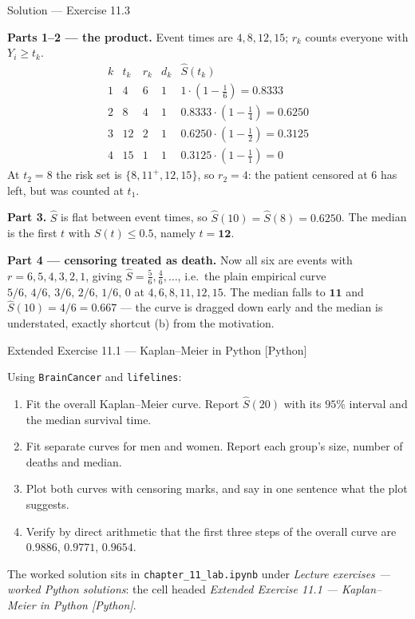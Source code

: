 \documentclass[aspectratio=169,11pt]{beamer}
\begin{document}
\begin{frame}{Solution --- Exercise 11.3}
  \footnotesize
\begin{solutionbox}
  \scriptsize
  \textbf{Parts 1--2 --- the product.} Event times are $4,8,12,15$; $r_k$ counts everyone
  with $Y_i\ge t_k$.
  \[
    \begin{array}{c|c|c|c|l}
      k & t_k & r_k & d_k & \hat S(t_k)\\ \hline
      1 & 4  & 6 & 1 & 1\cdot(1-\tfrac16)=0.8333\\
      2 & 8  & 4 & 1 & 0.8333\cdot(1-\tfrac14)=0.6250\\
      3 & 12 & 2 & 1 & 0.6250\cdot(1-\tfrac12)=0.3125\\
      4 & 15 & 1 & 1 & 0.3125\cdot(1-\tfrac11)=0
    \end{array}
  \]
  At $t_2=8$ the risk set is $\{8,11^{+},12,15\}$, so $r_2=4$: the patient censored at
  $6$ has left, but was counted at $t_1$.

  \medskip
  \textbf{Part 3.} $\hat S$ is flat between event times, so $\hat S(10)=\hat S(8)=0.6250$.
  The median is the first $t$ with $\hat S(t)\le 0.5$, namely $t=\mathbf{12}$.

  \medskip
  \textbf{Part 4 --- censoring treated as death.} Now all six are events with
  $r=6,5,4,3,2,1$, giving $\hat S=\tfrac56,\tfrac46,\dots$, i.e.\ the plain empirical
  curve $5/6,\,4/6,\,3/6,\,2/6,\,1/6,\,0$ at $4,6,8,11,12,15$. The median falls to
  $\mathbf{11}$ and $\hat S(10)=4/6=0.667$ --- the curve is dragged down early and the
  median is understated, exactly shortcut (b) from the motivation.
\end{solutionbox}
\end{frame}

\begin{frame}{Extended Exercise 11.1 --- Kaplan--Meier in Python [Python]}
\begin{longexercise}
  Using \texttt{BrainCancer} and \texttt{lifelines}:
  \begin{enumerate}
    \item Fit the overall Kaplan--Meier curve. Report $\hat S(20)$ with its $95\%$
          interval and the median survival time.
    \item Fit separate curves for men and women. Report each group's size, number of
          deaths and median.
    \item Plot both curves with censoring marks, and say in one sentence what the plot
          suggests.
    \item Verify by direct arithmetic that the first three steps of the overall curve
          are $0.9886$, $0.9771$, $0.9654$.
  \end{enumerate}
\end{longexercise}
\begin{labnote}
  The worked solution sits in \texttt{chapter\_11\_lab.ipynb} under
  \emph{Lecture exercises --- worked Python solutions}: the cell headed
  \emph{Extended Exercise 11.1 --- Kaplan--Meier in Python [Python]}.
\end{labnote}
\end{frame}
\end{document}
